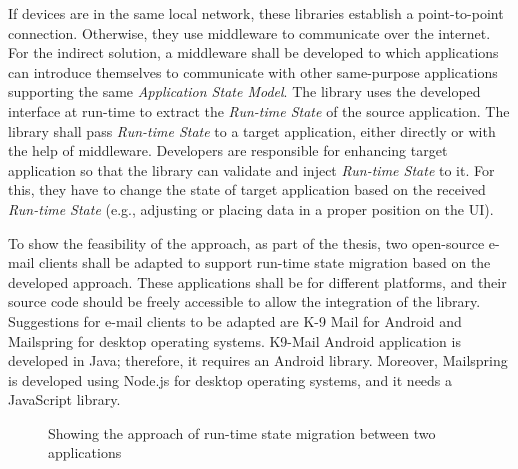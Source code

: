 If devices are in the same local network, these libraries establish a point-to-point connection. Otherwise, they use middleware to communicate over the internet.
For the indirect solution, a middleware shall be developed to which applications can introduce themselves to communicate with other same-purpose applications supporting the same \textit{Application State Model}. 
The library uses the developed interface at run-time to extract the \textit{Run-time State} of the source application. The library shall pass \textit{Run-time State} to a target application, either directly or with the help of middleware. 
Developers are responsible for enhancing target application so that the library can validate and inject \textit{Run-time State} to it. 
For this, they have to change the state of target application based on the received \textit{Run-time State} (e.g., adjusting or placing data in a proper position on the UI). 

To show the feasibility of the approach, as part of the thesis, two open-source e-mail clients shall be adapted to support run-time state migration based on the developed approach. These applications shall be for different platforms, and their source code should be freely accessible to allow the integration of the library.
Suggestions for e-mail clients to be adapted are K-9 Mail for Android and Mailspring for desktop operating systems.
K9-Mail Android application is developed in Java; therefore, it requires an Android library. Moreover, Mailspring is developed using Node.js for desktop operating systems, and it needs a JavaScript library.

\FloatBarrier
\begin{figure}[!b]
    
    \caption{Showing the approach of run-time state migration between two applications }
    \label{fig:solution}
\end{figure}
\FloatBarrier

